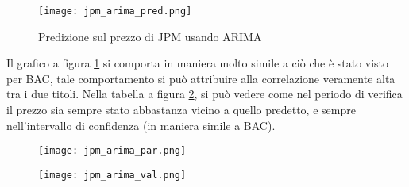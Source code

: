 \begin{figure}[ht]
    \centering
    \texttt{[image: jpm\_arima\_pred.png]}
    \caption{Predizione sul prezzo di JPM usando ARIMA}
    \label{fig:jpm_arima_pred}
\end{figure}

Il grafico a figura \ref{fig:jpm_arima_pred} si comporta in maniera molto simile a ciò che è stato visto per BAC, tale comportamento si può attribuire alla correlazione
veramente alta tra i due titoli. Nella tabella a figura \ref{fig:jpm_arima_val}, si può vedere come nel periodo di verifica il prezzo sia sempre stato abbastanza vicino a quello predetto, e sempre 
nell'intervallo di confidenza (in maniera simile a BAC).

\begin{figure}[ht]
    \centering
    \begin{minipage}{.5\textwidth}
        \centering
        \vspace{2.53cm}
        \texttt{[image: jpm\_arima\_par.png]}
        \label{fig:jpm_arima_param}
    \end{minipage}%
    \begin{minipage}{.5\textwidth}
        \centering
        \texttt{[image: jpm\_arima\_val.png]}
        \label{fig:jpm_arima_val}
    \end{minipage}
\end{figure}

\pagebreak